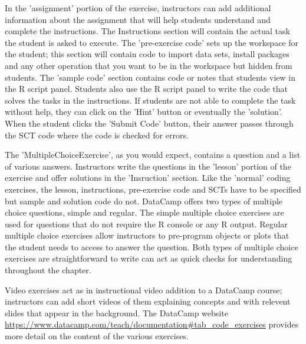 \documentclass{tise_style}
\begin{document}

In the 'assignment' portion of the exercise, instructors can add additional information about the assignment that will help
students understand and complete the instructions. The Instructions section will contain the actual task the student is
asked to execute. The 'pre-exercise code' sets up the workspace for the student; this section will contain code to import
data sets, install packages and any other operation that you want to be in the workspace but hidden from students. The 'sample
code' section contains code or notes that students view in the R script panel. Students also use the R script panel to write
the code that solves the tasks in the instructions. If students are not able to complete the task without help, they can click
on the 'Hint' button or eventually the 'solution'. When the student clicks the 'Submit Code' button, their answer passes through the SCT code where 
the code is checked for errors.


The 'MultipleChoiceExercise', as you would expect, contains a question and a list of various answers. Instructors write the questions in the 'lesson'
portion of the exercise and offer solutions in the 'Insruction' section. Like the 'normal' coding exercises, the lesson, instructions, pre-exercise 
code and SCTs have to be specified but sample and solution code do not. DataCamp offers two types of multiple choice questions, simple and regular. 
The simple multiple choice exercises are used for questions that do not require the R console or any R output. Regular multiple choice exercises 
allow instructors to pre-program objects or plots that the student needs to access to answer the question. Both types of multiple choice exercises 
are straightforward to write can act as quick checks for understanding throughout the chapter.


Video exercises act as in instructional video addition to a DataCamp course; instructors can add short videos of them explaining concepts and with 
relevent slides that appear in the background. The DataCamp website \url{https://www.datacamp.com/teach/documentation#tab_code_exercises} provides 
more detail on the content of the various exercises. 







%


\end{document}
